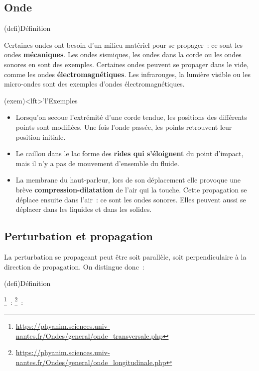 \documentclass[../../main/main.tex]{subfiles}
\begin{document}
\subsection{Onde}
\begin{tcb}(defi){Définition}
\end{tcb}

Certaines ondes ont besoin d'un milieu matériel pour se propager~: ce sont les
ondes \textbf{mécaniques}. Les ondes sismiques, les ondes dans la corde ou les
ondes sonores en sont des exemples. Certaines ondes peuvent se propager dans le
vide, comme les ondes \textbf{électromagnétiques}. Les infrarouges, la lumière
visible ou les micro-ondes sont des exemples d'ondes électromagnétiques.

\begin{tcb}(exem)<lft>'l'{Exemples}
	\begin{itemize}
		\item Lorsqu'on secoue l'extrémité d'une corde tendue,
		      les positions des différents points sont modifiées. Une fois l'onde
		      passée, les points retrouvent leur position initiale.
		\item Le caillou dans le lac forme des \textbf{rides qui s'éloignent} du point
		      d'impact, mais il n'y a pas de mouvement d'ensemble du
		      fluide.
		\item La membrane du haut-parleur, lors de son déplacement elle provoque
		      une brève \textbf{compression-dilatation} de l'air qui la touche.
		      Cette propagation se déplace ensuite dans l'air~: ce sont les ondes
		      sonores. Elles peuvent aussi se déplacer dans les liquides et dans
		      les solides.
	\end{itemize}
\end{tcb}

\subsection{Perturbation et propagation}

La perturbation se propageant peut être soit parallèle, soit perpendiculaire à
la direction de propagation. On distingue donc~:

\begin{tcb}(defi){Définition}
	\begin{itemize}
		\footnote{\url{https://phyanim.sciences.univ-nantes.fr/Ondes/general/onde_transversale.php}}~:
		\footnote{\url{https://phyanim.sciences.univ-nantes.fr/Ondes/general/onde_longitudinale.php}}~:
	\end{itemize}
\end{tcb}
\end{document}
